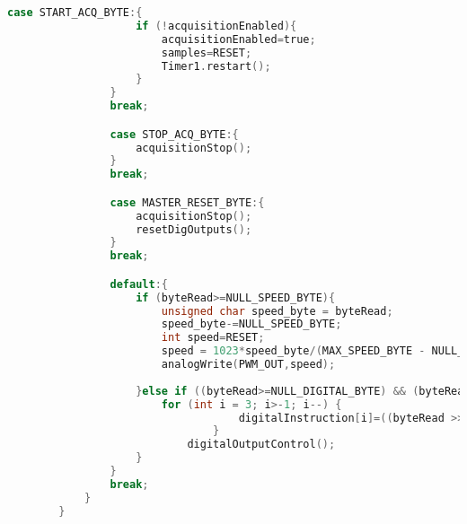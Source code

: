 \begin{lstlisting}[language=C]
				case START_ACQ_BYTE:{
					if (!acquisitionEnabled){
						acquisitionEnabled=true;
						samples=RESET;
						Timer1.restart();
					}
				}
				break;

				case STOP_ACQ_BYTE:{
					acquisitionStop();
				}
				break;

				case MASTER_RESET_BYTE:{
					acquisitionStop();
					resetDigOutputs();
				}
				break;

				default:{
					if (byteRead>=NULL_SPEED_BYTE){
						unsigned char speed_byte = byteRead;
						speed_byte-=NULL_SPEED_BYTE;
						int speed=RESET;
						speed = 1023*speed_byte/(MAX_SPEED_BYTE - NULL_SPEED_BYTE);
						analogWrite(PWM_OUT,speed);
						
					}else if ((byteRead>=NULL_DIGITAL_BYTE) && (byteRead<=MAX_DIGITAL_BYTE)){
						for (int i = 3; i>-1; i--) {
									digitalInstruction[i]=((byteRead >> i) & 1);
								}
							digitalOutputControl();
					}
				}
				break;
			}
		}
	\end{lstlisting}
